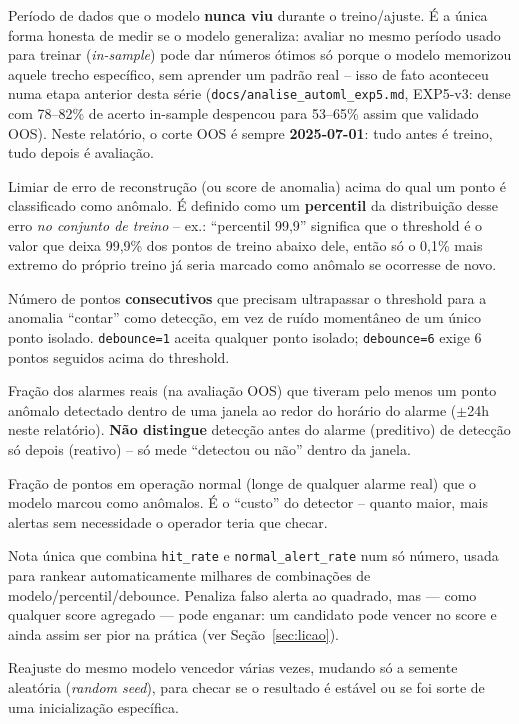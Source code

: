 \documentclass[11pt,a4paper]{article}
\begin{document}
\begin{description}[leftmargin=2.6cm, style=nextline]
  \item[OOS (\emph{out-of-sample})] Período de dados que o modelo
    \textbf{nunca viu} durante o treino/ajuste. É a única forma honesta de
    medir se o modelo generaliza: avaliar no mesmo período usado para
    treinar (\emph{in-sample}) pode dar números ótimos só porque o modelo
    memorizou aquele trecho específico, sem aprender um padrão real --
    isso de fato aconteceu numa etapa anterior desta série
    (\texttt{docs/analise\_automl\_exp5.md}, EXP5-v3: dense com 78--82\%
    de acerto in-sample despencou para 53--65\% assim que validado OOS).
    Neste relatório, o corte OOS é sempre \textbf{2025-07-01}: tudo antes
    é treino, tudo depois é avaliação.
  \item[threshold] Limiar de erro de reconstrução (ou score de anomalia)
    acima do qual um ponto é classificado como anômalo. É definido como um
    \textbf{percentil} da distribuição desse erro \emph{no conjunto de
    treino} -- ex.: ``percentil 99,9'' significa que o threshold é o valor
    que deixa 99,9\% dos pontos de treino abaixo dele, então só o 0,1\%
    mais extremo do próprio treino já seria marcado como anômalo se
    ocorresse de novo.
  \item[debounce] Número de pontos \textbf{consecutivos} que precisam
    ultrapassar o threshold para a anomalia ``contar'' como detecção, em
    vez de ruído momentâneo de um único ponto isolado. \texttt{debounce=1}
    aceita qualquer ponto isolado; \texttt{debounce=6} exige 6 pontos
    seguidos acima do threshold.
  \item[hit\_rate] Fração dos alarmes reais (na avaliação OOS) que tiveram
    pelo menos um ponto anômalo detectado dentro de uma janela ao redor do
    horário do alarme ($\pm$24h neste relatório). \textbf{Não distingue}
    detecção antes do alarme (preditivo) de detecção só depois (reativo)
    -- só mede ``detectou ou não'' dentro da janela.
  \item[normal\_alert\_rate (FP, falso alerta/falso positivo)] Fração de
    pontos em operação normal (longe de qualquer alarme real) que o
    modelo marcou como anômalos. É o ``custo'' do detector -- quanto
    maior, mais alertas sem necessidade o operador teria que checar.
  \item[composite\_score / balanced\_score] Nota única que combina
    \texttt{hit\_rate} e \texttt{normal\_alert\_rate} num só número, usada
    para rankear automaticamente milhares de combinações de
    modelo/percentil/debounce. Penaliza falso alerta ao quadrado, mas
    --- como qualquer score agregado --- pode enganar: um candidato pode
    vencer no score e ainda assim ser pior na prática (ver
    Seção~\ref{sec:licao}).
  \item[seed-sweep (variância de semente)] Reajuste do mesmo modelo
    vencedor várias vezes, mudando só a semente aleatória
    (\emph{random seed}), para checar se o resultado é estável ou se foi
    sorte de uma inicialização específica.
\end{description}
\end{document}
